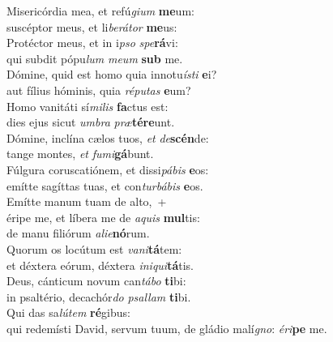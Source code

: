 \evenverse Misericórdia mea, et refú\textit{gi}\textit{um} \textbf{me}um:~\*\\
\evenverse suscéptor meus, et li\textit{be}\textit{rá}\textit{tor} \textbf{me}us:\\
\oddverse Protéctor meus, et in i\textit{pso} \textit{spe}\textbf{rá}vi:~\*\\
\oddverse qui subdit pópu\textit{lum} \textit{me}\textit{um} \textbf{sub} me.\\
\evenverse Dómine, quid est homo quia innotu\textit{í}\textit{sti} \textbf{e}i?~\*\\
\evenverse aut fílius hóminis, quia \textit{ré}\textit{pu}\textit{tas} \textbf{e}um?\\
\oddverse Homo vanitáti sí\textit{mi}\textit{lis} \textbf{fa}ctus est:~\*\\
\oddverse dies ejus sicut \textit{um}\textit{bra} \textit{præ}\textbf{té}\textbf{re}unt.\\
\evenverse Dómine, inclína cælos tuos, \textit{et} \textit{de}\textbf{scén}de:~\*\\
\evenverse tange montes, \textit{et} \textit{fu}\textit{mi}\textbf{gá}bunt.\\
\oddverse Fúlgura coruscatiónem, et dissi\textit{pá}\textit{bis} \textbf{e}os:~\*\\
\oddverse emítte sagíttas tuas, et con\textit{tur}\textit{bá}\textit{bis} \textbf{e}os.\\
\evenverse Emítte manum tuam de alto,~+\\
\evenverse  éripe me, et líbera me de \textit{a}\textit{quis} \textbf{mul}tis:~\*\\
\evenverse de manu filiórum \textit{a}\textit{li}\textit{e}\textbf{nó}rum.\\
\oddverse Quorum os locútum est \textit{va}\textit{ni}\textbf{tá}tem:~\*\\
\oddverse et déxtera eórum, déxtera \textit{i}\textit{ni}\textit{qui}\textbf{tá}tis.\\
\evenverse Deus, cánticum novum can\textit{tá}\textit{bo} \textbf{ti}bi:~\*\\
\evenverse in psaltério, decachór\textit{do} \textit{psal}\textit{lam} \textbf{ti}bi.\\
\oddverse Qui das sa\textit{lú}\textit{tem} \textbf{ré}gibus:~\*\\
\oddverse qui redemísti David, servum tuum, de gládio malí\textit{gno}: \textit{é}\textit{ri}\textbf{pe} me.\\

